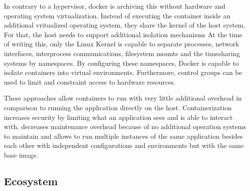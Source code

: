 In contrary to a hypervisor, docker is archiving this without hardware and operating system virtualization.
Instead of executing the container inside an additional vritualized operating system, they share the kernel of the host system.
For that, the host needs to support additional isolation mechanisms
At the time of writing this, only the Linux Kernel is capable to separate processes, network interfaces, interprocess communications, filesystem mounts and the timesharing systems by namespaces.
By configuring these namespaces, Docker is capable to isolate containers into virtual environments.
Furthermore, control groups can be used to limit and constraint access to hardware resources.
\cite{docker:overview}

These approaches allow containers to run with very little additional overhead in comparison to running the application directly on the host.
Containerization increases security by limiting what an application sees and is able to interact with, decreases maintenance overhead because of no additional operation systems to maintain and allows to run multiple instances of the same application besides each other with independent configurations and environments but with the same base image.

\subsection{Ecosystem}
\label{docker:ecosystem}

